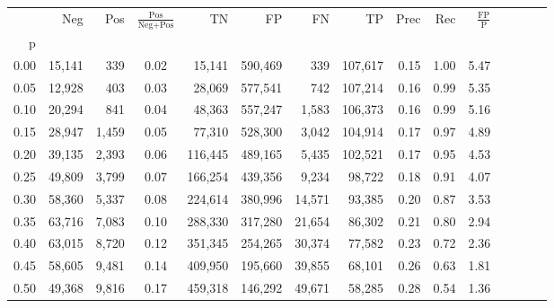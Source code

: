 \begin{tabular}{rrrcrrrrrrrrrrr}
\toprule
{} &     Neg &    Pos & $\frac{\text{Pos}}{\text{Neg}+\text{Pos}}$ &       TN &       FP &       FN &       TP &  Prec &   Rec & $\frac{\text{FP}}{\text{P}}$ \\
p    &         &        &                                            &          &          &          &          &       &       &                              \\
\midrule
0.00 &  15,141 &    339 &                                       0.02 &   15,141 &  590,469 &      339 &  107,617 &  0.15 &  1.00 &                         5.47 \\
0.05 &  12,928 &    403 &                                       0.03 &   28,069 &  577,541 &      742 &  107,214 &  0.16 &  0.99 &                         5.35 \\
0.10 &  20,294 &    841 &                                       0.04 &   48,363 &  557,247 &    1,583 &  106,373 &  0.16 &  0.99 &                         5.16 \\
0.15 &  28,947 &  1,459 &                                       0.05 &   77,310 &  528,300 &    3,042 &  104,914 &  0.17 &  0.97 &                         4.89 \\
0.20 &  39,135 &  2,393 &                                       0.06 &  116,445 &  489,165 &    5,435 &  102,521 &  0.17 &  0.95 &                         4.53 \\
0.25 &  49,809 &  3,799 &                                       0.07 &  166,254 &  439,356 &    9,234 &   98,722 &  0.18 &  0.91 &                         4.07 \\
0.30 &  58,360 &  5,337 &                                       0.08 &  224,614 &  380,996 &   14,571 &   93,385 &  0.20 &  0.87 &                         3.53 \\
0.35 &  63,716 &  7,083 &                                       0.10 &  288,330 &  317,280 &   21,654 &   86,302 &  0.21 &  0.80 &                         2.94 \\
0.40 &  63,015 &  8,720 &                                       0.12 &  351,345 &  254,265 &   30,374 &   77,582 &  0.23 &  0.72 &                         2.36 \\
0.45 &  58,605 &  9,481 &                                       0.14 &  409,950 &  195,660 &   39,855 &   68,101 &  0.26 &  0.63 &                         1.81 \\
0.50 &  49,368 &  9,816 &                                       0.17 &  459,318 &  146,292 &   49,671 &   58,285 &  0.28 &  0.54 &                         1.36 \\

\end{tabular}
